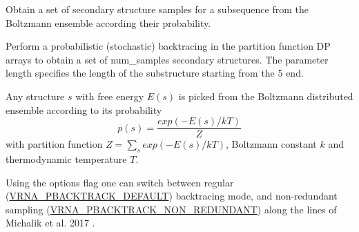 Obtain a set of secondary structure samples for a subsequence from the Boltzmann ensemble according their probability. 

Perform a probabilistic (stochastic) backtracing in the partition function DP arrays to obtain a set of {\ttfamily num\+\_\+samples} secondary structures. The parameter {\ttfamily length} specifies the length of the substructure starting from the 5\textquotesingle{} end.

Any structure $ s $ with free energy $ E(s) $ is picked from the Boltzmann distributed ensemble according to its probability \[ p(s) = \frac{exp(-E(s) / kT)}{Z} \] with partition function $ Z = \sum_s exp(-E(s) / kT) $, Boltzmann constant $ k $ and thermodynamic temperature $ T $.

Using the {\ttfamily options} flag one can switch between regular (\mbox{\hyperlink{group__subopt__stochbt_ga760aa2fb2d5e3d7521a11454a21e9b9f}{V\+R\+N\+A\+\_\+\+P\+B\+A\+C\+K\+T\+R\+A\+C\+K\+\_\+\+D\+E\+F\+A\+U\+LT}}) backtracing mode, and non-\/redundant sampling (\mbox{\hyperlink{group__subopt__stochbt_ga9d580ce645aa0c38b69afdf56c332200}{V\+R\+N\+A\+\_\+\+P\+B\+A\+C\+K\+T\+R\+A\+C\+K\+\_\+\+N\+O\+N\+\_\+\+R\+E\+D\+U\+N\+D\+A\+NT}}) along the lines of Michalik et al. 2017 \cite{michalik:2017}.

